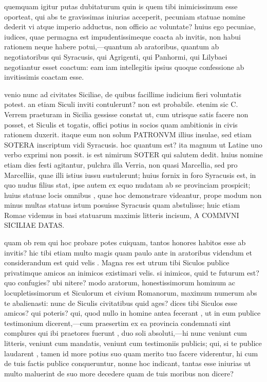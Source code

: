  quemquam igitur putas dubitaturum quin is quem tibi inimicissimum esse oporteat, qui abs te gravissimas iniurias acceperit, pecuniam statuae nomine dederit vi atque imperio adductus, non officio ac voluntate? huius ego pecuniae, iudices, quae permagna est impudentissimeque coacta ab invitis, non habui rationem neque habere potui,—quantum ab aratoribus, quantum ab negotiatoribus qui Syracusis, qui Agrigenti, qui Panhormi, qui Lilybaei negotiantur esset coactum: eam iam intellegitis ipsius quoque confessione ab invitissimis coactam esse.

 venio nunc ad civitates Siciliae, de quibus facillime iudicium fieri voluntatis potest. an etiam Siculi inviti contulerunt? non est probabile. etenim sic C. Verrem praeturam in Sicilia gessisse constat ut, cum utrisque satis facere non posset, et Siculis et togatis, offici potius in socios quam ambitionis in civis rationem duxerit. itaque eum non solum PATRONVM illius insulae, sed etiam SOTERA inscriptum vidi Syracusis. hoc quantum est? ita magnum ut Latine uno verbo exprimi non possit. is est nimirum SOTER qui salutem dedit. huius nomine etiam dies festi agitantur, pulchra illa Verria, non quasi Marcellia, sed pro Marcelliis, quae illi istius iussu sustulerunt; huius fornix in foro Syracusis est, in quo nudus filius stat, ipse autem ex equo nudatam ab se provinciam prospicit; huius statuae locis omnibus , quae hoc demonstrare videantur, prope modum non minus multas statuas istum posuisse Syracusis quam abstulisse; huic etiam Romae videmus in basi statuarum maximis litteris incisum, A COMMVNI SICILIAE DATAS.

 quam ob rem qui hoc probare potes cuiquam, tantos honores habitos esse ab invitis? hic tibi etiam multo magis quam paulo ante in aratoribus videndum et considerandum est quid velis . Magna res est utrum tibi Siculos publice privatimque amicos an inimicos existimari velis. si inimicos, quid te futurum est? quo confugies? ubi nitere? modo aratorum, honestissimorum hominum ac locupletissimorum et Siculorum et civium Romanorum, maximum numerum abs te abalienasti: nunc de Siculis civitatibus quid ages? dices tibi Siculos esse amicos? qui poteris? qui, quod nullo in homine antea fecerant , ut in eum publice testimonium dicerent,—cum praesertim ex ea provincia condemnati sint complures qui ibi praetores fuerunt , duo soli absoluti,—hi nunc veniunt cum litteris, veniunt cum mandatis, veniunt cum testimoniis publicis; qui, si te publice laudarent , tamen id more potius suo quam merito tuo facere viderentur, hi cum de tuis factis publice conqueruntur, nonne hoc indicant, tantas esse iniurias ut multo maluerint de suo more decedere quam de tuis moribus non dicere?

